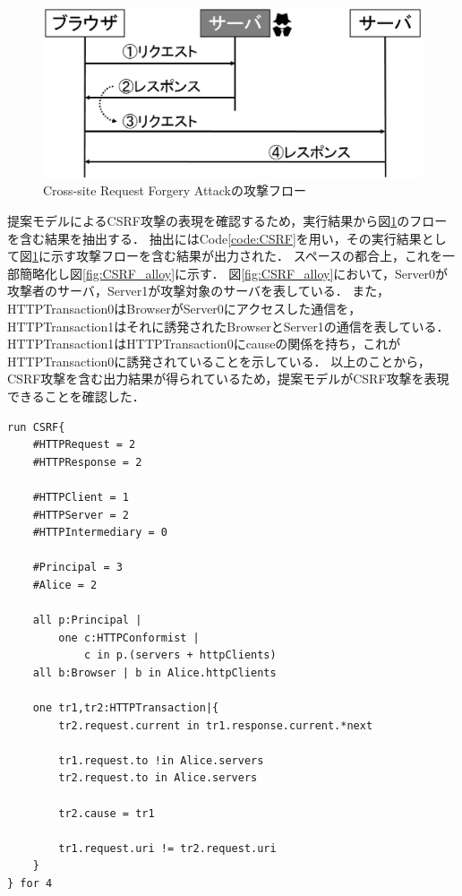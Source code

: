\documentclass[12pt,a4paper]{jbook}
\begin{document}
\begin{figure}[htb]
\centering
\includegraphics[width=400pt]{./fig/CSRF_flow.eps}
\caption{Cross-site Request Forgery Attackの攻撃フロー}
\label{fig:CSRF_flow}
\end{figure}

提案モデルによるCSRF攻撃の表現を確認するため，実行結果から図\ref{fig:CSRF_flow}のフローを含む結果を抽出する．
抽出にはCode\ref{code:CSRF}を用い，その実行結果として図\ref{fig:CSRF_flow}に示す攻撃フローを含む結果が出力された．
スペースの都合上，これを一部簡略化し図\ref{fig:CSRF_alloy}に示す．
図\ref{fig:CSRF_alloy}において，Server0が攻撃者のサーバ，Server1が攻撃対象のサーバを表している．
また，HTTPTransaction0はBrowserがServer0にアクセスした通信を，HTTPTransaction1はそれに誘発されたBrowserとServer1の通信を表している．
HTTPTransaction1はHTTPTransaction0にcauseの関係を持ち，これがHTTPTransaction0に誘発されていることを示している．
以上のことから，CSRF攻撃を含む出力結果が得られているため，提案モデルがCSRF攻撃を表現できることを確認した．

\begin{lstlisting}[caption=CSRF攻撃の表現, label=code:CSRF]
run CSRF{
	#HTTPRequest = 2
	#HTTPResponse = 2

	#HTTPClient = 1
	#HTTPServer = 2
	#HTTPIntermediary = 0

	#Principal = 3
	#Alice = 2

	all p:Principal |
		one c:HTTPConformist |
			c in p.(servers + httpClients)
	all b:Browser | b in Alice.httpClients

	one tr1,tr2:HTTPTransaction|{
		tr2.request.current in tr1.response.current.*next

		tr1.request.to !in Alice.servers
		tr2.request.to in Alice.servers

		tr2.cause = tr1

		tr1.request.uri != tr2.request.uri
	}
} for 4
\end{lstlisting}
\end{document}
